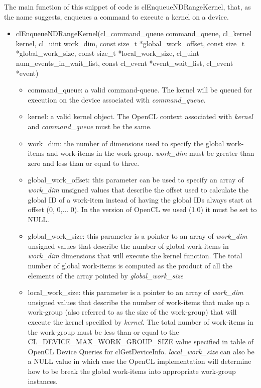 \documentclass[titlepage]{article}
\begin{document}
The main function of this snippet of code is clEnqueueNDRangeKernel, that, as the name suggests, enqueues a command to execute a kernel on a device.

\begin{itemize}
    \item clEnqueueNDRangeKernel(cl\_command\_queue command\_queue, cl\_kernel kernel, cl\_uint work\_dim, const size\_t *global\_work\_offset, const size\_t *global\_work\_size, const size\_t *local\_work\_size, cl\_uint num\_events\_in\_wait\_list, const cl\_event *event\_wait\_list, cl\_event *event)
    \begin{itemize}
        \item command\_queue: a valid command-queue. The kernel will be queued for execution on the device associated with \textit{command\_queue}.
        \item kernel: a valid kernel object. The OpenCL context associated with \textit{kernel} and \textit{command\_queue} must be the same.
        \item work\_dim: the number of dimensions used to specify the global work-items and work-items in the work-group. \textit{work\_dim} must be greater than zero and less than or equal to three.
        \item global\_work\_offset: this parameter can be used to specify an array of \textit{work\_dim} unsigned values that describe the offset used to calculate the global ID of a work-item instead of having the global IDs always start at offset (0, 0,... 0). In the version of OpenCL we used (1.0) it must be set to NULL.
        \item global\_work\_size: this parameter is a pointer to an array of \textit{work\_dim} unsigned values that describe the number of global work-items in \textit{work\_dim} dimensions that will execute the kernel function. The total number of global work-items is computed as the product of all the elements of the array pointed by \textit{global\_work\_size}
        \item local\_work\_size: this parameter is a pointer to an array of \textit{work\_dim} unsigned values that describe the number of work-items that make up a work-group (also referred to as the size of the work-group) that will execute the kernel specified by \textit{kernel}. The total number of work-items in the work-group must be less than or equal to the CL\_DEVICE\_MAX\_WORK\_GROUP\_SIZE value specified in table of OpenCL Device Queries for clGetDeviceInfo. \textit{local\_work\_size} can also be a NULL value in which case the OpenCL implementation will determine how to be break the global work-items into appropriate work-group instances.

\end{itemize}
\end{itemize}
\end{document}
